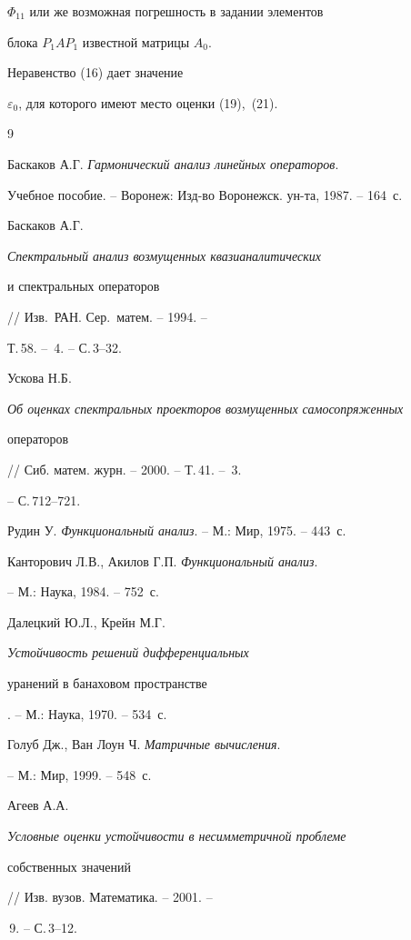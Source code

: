 $\Phi_{11}$  или же возможная погрешность в задании элементов


блока  $P_1A P_1$ известной матрицы $A_0$.








\begin{notenonum}


Неравенство (16) дает значение


$\varepsilon_0$, для которого имеют место оценки (19),~(21).


\end{notenonum}








\begin{thebibliography}{9}







Баскаков А.Г. {\em Гармонический анализ линейных операторов}. 


Учебное пособие. -- Воронеж: Изд-во Воронежск. ун-та, 1987. -- 164~с.




Баскаков А.Г. {\em Спектральный анализ возмущенных квазианалитических 


и спектральных операторов} // Изв.~РАН. Сер.~матем. -- 1994. --


Т.\,58. -- \No\,4. -- С.\,3--32.




Ускова Н.Б. {\em Об оценках спектральных проекторов возмущенных самосопряженных 


операторов} // Сиб. матем. журн. -- 2000. -- Т.\,41. -- \No\,3.


-- С.\,712--721.




Рудин У. {\em Функциональный анализ}. -- М.: Мир, 1975. -- 443~с.




Канторович Л.В., Акилов Г.П. {\em Функциональный анализ}.


-- М.: Наука, 1984. -- 752~с.




Далецкий Ю.Л., Крейн М.Г. {\em Устойчивость решений дифференциальных 


уранений в банаховом пространстве}. -- М.: Наука, 1970. -- 534~с.




Голуб Дж., Ван Лоун Ч. {\em Матричные вычисления}.


-- М.: Мир, 1999. -- 548~с.




Агеев А.А. {\em Условные оценки устойчивости в несимметричной проблеме 


собственных значений} // Изв. вузов. Математика. -- 2001. --


\No\,9. -- С.\,3--12.





\end{thebibliography}
